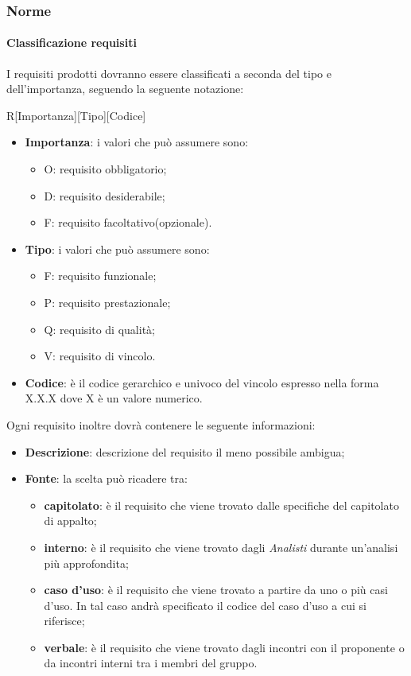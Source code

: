 		\subsubsection{Norme}
			\paragraph{Classificazione requisiti}
I requisiti prodotti dovranno essere classificati a seconda del tipo e dell'importanza, seguendo la seguente notazione:
				\begin{center}
					R[Importanza][Tipo][Codice]
				\end{center}
			\noindent
				\begin{itemize}
					\item \textbf{Importanza}: i valori che può assumere sono:
						\begin{itemize}
							\item O: requisito obbligatorio;
							\item D: requisito desiderabile;
							\item F: requisito facoltativo(opzionale).
						\end{itemize}
					\item \textbf{Tipo}: i valori che può assumere sono:
						\begin{itemize}
							\item F: requisito funzionale;
							\item P: requisito prestazionale;
							\item Q: requisito di qualità;
							\item V: requisito di vincolo.
						\end{itemize}
					\item \textbf{Codice}: è il codice gerarchico e univoco del vincolo espresso nella forma X.X.X dove X è un valore numerico.
				\end{itemize}
			\noindent
			Ogni requisito inoltre dovrà contenere le seguente informazioni:
				\begin{itemize}
					\item \textbf{Descrizione}: descrizione del requisito il meno possibile ambigua;
					\item \textbf{Fonte}: la scelta può ricadere tra:
						\begin{itemize}
							\item \textbf{capitolato}: è il requisito che viene trovato dalle specifiche del capitolato di appalto;
							\item \textbf{interno}: è il requisito che viene trovato dagli \emph{Analisti} durante un'analisi più approfondita;
							\item \textbf{caso d'uso}: è il requisito che viene trovato a partire da uno o più casi d'uso. In tal caso andrà specificato il codice del caso d'uso a cui si riferisce;
							\item \textbf{verbale}: è il requisito che viene trovato dagli incontri con il proponente o da incontri interni tra i membri del gruppo.
						\end{itemize}
				\end{itemize}
			
